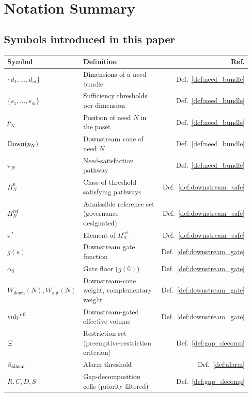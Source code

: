 \section{Notation Summary}
\label{app:notation}

\subsection{Symbols introduced in this paper}

\begin{center}
\small
\begin{tabular}{@{}llr@{}}
\toprule
\textbf{Symbol} & \textbf{Definition} & \textbf{Ref.} \\
\midrule
$\{d_1,\ldots,d_m\}$ & Dimensions of a need bundle
  & Def.~\ref{def:need_bundle} \\
$\{s_1,\ldots,s_m\}$ & Sufficiency thresholds per dimension
  & Def.~\ref{def:need_bundle} \\
$p_N$ & Position of need $N$ in the poset
  & Def.~\ref{def:need_bundle} \\
$\mathrm{Down}(p_N)$ & Downstream cone of need $N$
  & Def.~\ref{def:need_bundle} \\
$\pi_N$ & Need-satisfaction pathway
  & Def.~\ref{def:need_bundle} \\
$\Pi_N^0$ & Class of threshold-satisfying pathways
  & Def.~\ref{def:downstream_safe} \\
$\Pi_N^{\mathrm{ref}}$ & Admissible reference set
  (governance-designated)
  & Def.~\ref{def:downstream_safe} \\
$\pi^*$ & Element of $\Pi_N^{\mathrm{ref}}$
  & Def.~\ref{def:downstream_safe} \\
$g(s)$ & Downstream gate function
  & Def.~\ref{def:downstream_gate} \\
$\alpha_0$ & Gate floor ($g(0)$)
  & Def.~\ref{def:downstream_gate} \\
$W_{\mathrm{down}}(N), W_{\mathrm{out}}(N)$
  & Downstream-cone weight, complementary weight
  & Def.~\ref{def:downstream_gate} \\
${\operatorname{vol}_{\mathrm{P}}}^{\mathrm{eff}}$ & Downstream-gated effective volume
  & Def.~\ref{def:downstream_gate} \\
$\Xi$ & Restriction set (preemptive-restriction criterion)
  & Def.~\ref{def:gap_decomp} \\
$\beta_{\mathrm{alarm}}$ & Alarm threshold
  & Def.~\ref{def:alarm} \\
$R, C, D, S$ & Gap-decomposition cells (priority-filtered)
  & Def.~\ref{def:gap_decomp} \\

\end{tabular}
\end{center}
